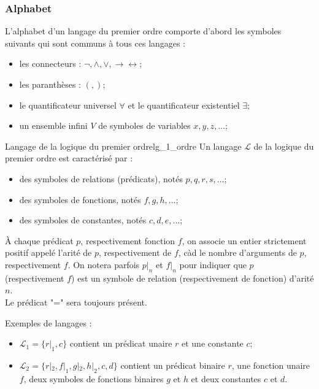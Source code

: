 \subsubsection{Alphabet}
\label{subsubsec:alphabet}
L'alphabet d'un langage du premier ordre comporte d'abord les symboles suivants qui sont communs à tous ces langages :
\begin{itemize}[label=\textbullet]
    \item les connecteurs : $\neg,\wedge,\vee,\rightarrow\leftrightarrow$;
    \item les paranthèses : $(,)$;
    \item le quantificateur universel $\forall$ et le quantificateur existentiel $\exists$;
    \item un ensemble infini $V$ de symboles de variables $x,y,z,\dots$;
\end{itemize}
\begin{definition}{Langage de la logique du premier ordre}{lg_1_ordre}
    Un langage $\mathcal{L}$ de la logique du premier ordre est caractérisé par :
    \begin{itemize}[label=\textbullet]
        \item des symboles de relations (prédicats), notés $p,q,r,s,\dots$;
        \item des symboles de fonctions, notés $f,g,h,\dots$;
        \item des symboles de constantes, notés $c,d,e,\dots$;
    \end{itemize}
    À chaque prédicat $p$, respectivement fonction $f$, on associe un entier strictement positif appelé 
    l'arité de $p$, respectivement de $f$, càd le nombre d'arguments de $p$, respectivement $f$. On notera parfois $p|_n$ 
    et $f|_n$ pour indiquer que $p$ (respectivement $f$) est un symbole de relation (respectivement de fonction) d'arité $n$.\\
    Le prédicat "=" sera toujours présent.
\end{definition}
\begin{example}
    Exemples de langages :
    \begin{itemize}[label=\textbullet]
        \item $\mathcal{L}_1 = \{r|_1,c\}$ contient un prédicat unaire $r$ et une constante $c$;
        \item $\mathcal{L}_2 = \{r|_2,f|_1,g|_2,h|_2,c,d\}$ contient un prédicat binaire $r$, une fonction unaire $f$,
        deux symboles de fonctions binaires $g$ et $h$ et deux constantes $c$ et $d$.\\
    \end{itemize}
\end{example}

